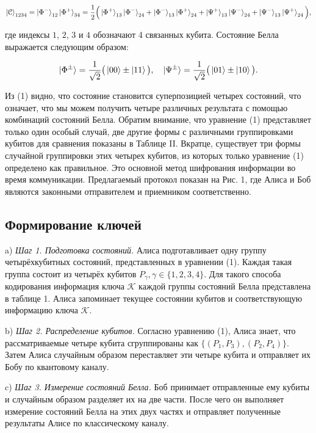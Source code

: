 \documentclass[a4paper,11pt]{article}
\begin{document}
\begin{equation*}
\ket{\mathcal{C}}_{1234} = \ket{\Phi^-}_{12} \ket{\Phi^+}_{34}
= \dfrac{1}{2} \Big(\ket{\Phi^+}_{13} \ket{\Phi^-}_{24} + 
 					\ket{\Phi^-}_{13} \ket{\Phi^+}_{24} +
 					\ket{\Psi^+}_{13} \ket{\Psi^-}_{24} +
 					\ket{\Psi^-}_{13} \ket{\Psi^+}_{24} \Big),
\end{equation*}

где индексы $1$, $2$, $3$ и $4$ обозначают 4 связанных кубита. Состояние Белла выражается следующим образом:

\begin{equation*}
\ket{\Phi^{\pm}} = \dfrac{1}{\sqrt2}\big(\ket{00} \pm \ket{11} \big), \quad
\ket{\Psi^{\pm}} = \dfrac{1}{\sqrt2}\big(\ket{01} \pm \ket{10} \big).
\end{equation*}


Из (1) видно, что состояние становится суперпозицией четырех состояний, что означает, что мы можем получить четыре различных результата с помощью комбинаций состояний Белла. Обратим внимание, что уравнение (1) представляет только один особый случай, две другие формы с различными группировками кубитов для сравнения показаны в Таблице II. Вкратце, существует три формы случайной группировки этих четырех кубитов, из которых только уравнение (1) определено как правильное. Это основной метод шифрования информации во время коммуникации. Предлагаемый протокол показан на Рис. 1, где Алиса и Боб являются законными отправителем и приемником соответственно.

\subsection{Формирование ключей}

a) \textit{Шаг 1. Подготовка состояний.} Алиса подготавливает одну группу четырёхкубитных состояний, представленных в уравнении (1). Каждая такая группа состоит из четырёх кубитов $P_\gamma, \gamma \in \{1,2,3,4\}$. Для такого способа кодирования информация ключа $\mathcal{K}$ каждой группы состояний Белла представлена в таблице 1. Алиса запоминает текущее состоянии кубитов и соответствующую информацию ключа $\mathcal{K}$.

b) \textit{Шаг 2. Распределение кубитов.} Согласно уравнению (1), Алиса знает, что рассматриваемые четыре кубита сгруппированы как $\{(P_1, P_3), (P_2, P_4)\}$. Затем Алиса случайным образом переставляет эти четыре кубита и отправляет их Бобу по квантовому каналу.

c) \textit{Шаг 3. Измерение состояний Белла.} Боб принимает отправленные ему кубиты и случайным образом разделяет их на две части. После чего он выполняет измерение состояний Белла на этих двух частях и отправляет полученные результаты Алисе по классическому каналу.
\end{document}
